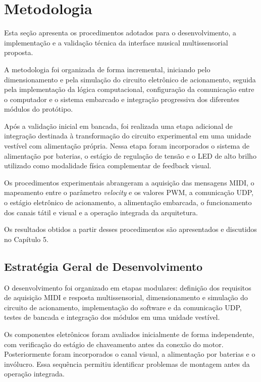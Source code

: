 \chapter{Metodologia}

Esta seção apresenta os procedimentos adotados para o desenvolvimento, a implementação e a validação técnica da interface musical multissensorial proposta.

A metodologia foi organizada de forma incremental, iniciando pelo dimensionamento e pela simulação do circuito eletrônico de acionamento, seguida pela implementação da lógica computacional, configuração da comunicação entre o computador e o sistema embarcado e integração progressiva dos diferentes módulos do protótipo.

Após a validação inicial em bancada, foi realizada uma etapa adicional de integração destinada à transformação do circuito experimental em uma unidade vestível com alimentação própria. Nessa etapa foram incorporados o sistema de alimentação por baterias, o estágio de regulação de tensão e o LED de alto brilho utilizado como modalidade física complementar de feedback visual.

Os procedimentos experimentais abrangeram a aquisição das mensagens MIDI, o mapeamento entre o parâmetro \textit{velocity} e os valores PWM, a comunicação UDP, o estágio eletrônico de acionamento, a alimentação embarcada, o funcionamento dos canais tátil e visual e a operação integrada da arquitetura.

Os resultados obtidos a partir desses procedimentos são apresentados e discutidos no Capítulo 5.

\section{Estratégia Geral de Desenvolvimento}
\label{sec:estrategia_desenvolvimento}

O desenvolvimento foi organizado em etapas modulares: definição dos requisitos de aquisição MIDI e resposta multissensorial, dimensionamento e simulação do circuito de acionamento, implementação do software e da comunicação UDP, testes de bancada e integração dos módulos em uma unidade vestível.

Os componentes eletrônicos foram avaliados inicialmente de forma independente, com verificação do estágio de chaveamento antes da conexão do motor. Posteriormente foram incorporados o canal visual, a alimentação por baterias e o invólucro. Essa sequência permitiu identificar problemas de montagem antes da operação integrada.

